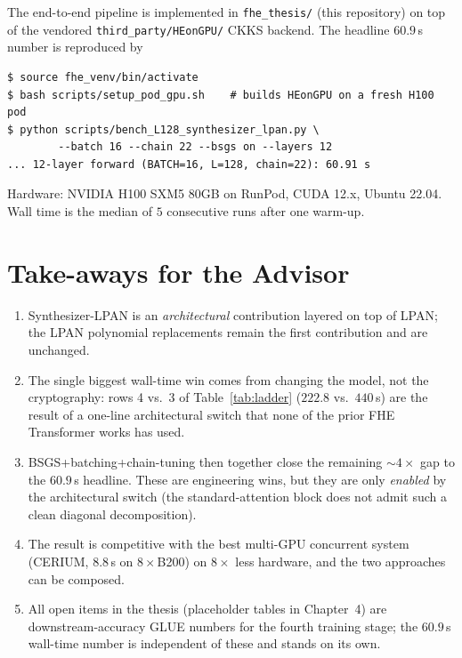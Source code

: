 \documentclass[11pt,a4paper]{article}
\begin{document}
The end-to-end pipeline is implemented in
\texttt{fhe\_thesis/} (this repository) on top of the vendored
\texttt{third\_party/HEonGPU/} CKKS backend.  The headline $60.9$\,s
number is reproduced by

\begin{center}
\begin{minipage}{0.85\linewidth}
\small
\begin{verbatim}
$ source fhe_venv/bin/activate
$ bash scripts/setup_pod_gpu.sh    # builds HEonGPU on a fresh H100 pod
$ python scripts/bench_L128_synthesizer_lpan.py \
        --batch 16 --chain 22 --bsgs on --layers 12
... 12-layer forward (BATCH=16, L=128, chain=22): 60.91 s
\end{verbatim}
\end{minipage}
\end{center}

Hardware: NVIDIA H100 SXM5 80GB on RunPod, CUDA 12.x, Ubuntu 22.04.
Wall time is the median of $5$ consecutive runs after one warm-up.

\section{Take-aways for the Advisor}

\begin{enumerate}[leftmargin=2em]
  \item Synthesizer-LPAN is an \emph{architectural} contribution layered
        on top of LPAN; the LPAN polynomial replacements remain the
        first contribution and are unchanged.
  \item The single biggest wall-time win comes from changing the model,
        not the cryptography: rows 4 vs.\ 3 of Table~\ref{tab:ladder}
        ($222.8$ vs.\ $440$\,s) are the result of a one-line
        architectural switch that none of the prior FHE Transformer
        works has used.
  \item BSGS+batching+chain-tuning then together close the remaining
        $\sim 4\times$ gap to the $60.9$\,s headline.  These are
        engineering wins, but they are only \emph{enabled} by the
        architectural switch (the standard-attention block does not
        admit such a clean diagonal decomposition).
  \item The result is competitive with the best multi-GPU concurrent
        system (CERIUM, $8.8$\,s on $8\times$B200) on $8\times$ less
        hardware, and the two approaches can be composed.
  \item All open items in the thesis (placeholder tables in Chapter~4)
        are downstream-accuracy GLUE numbers for the fourth training
        stage; the $60.9$\,s wall-time number is independent of these
        and stands on its own.
\end{enumerate}
\end{document}
